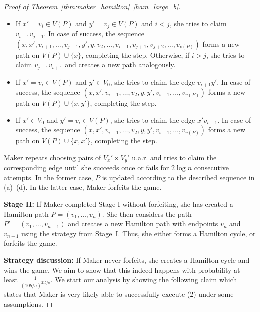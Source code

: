 \documentclass[11pt, a4paper]{article}
\numberwithin{equation}{section}
\numberwithin{figure}{section}
\begin{document}
\begin{proof}[Proof of Theorem~\ref{thm:maker_hamilton}~\ref{ham_large_b}]
\begin{enumerate}
\begin{itemize}
    \item[(b)] If $x'=v_i \in V(P)$ and $y'=v_j \in V(P)$ and $i < j$, she tries to claim $v_{i-1}v_{j+1}$. In case of success, the sequence 
    $(x,x',v_{i+1},\ldots,v_{j-1},y',y,v_2,\ldots,v_{i-1},v_{j+1},v_{j+2},\ldots,v_{v(P)})$ forms a new path on $V(P) \cup \{x\}$, completing the step. Otherwise, if $i > j$, she tries to claim $v_{j-1}v_{i+1}$ and creates a new path analogously.
    
    \item[(c)] If $x'=v_i \in V(P)$ and $y' \in V_0$, she tries to claim the edge $v_{i+1}y'$. In case of success, the sequence $(x,x',v_{i-1},\ldots,v_2,y,y',v_{i+1},\ldots,v_{v(P)})$ forms a new path on $V(P) \cup \{x,y'\}$, completing the step.
    
    \item[(d)] If $x' \in V_0$ and $y'=v_i \in V(P)$, she tries to claim the edge $x'v_{i-1}$. In case of success, the sequence $(x,x',v_{i-1},\ldots,v_2,y,y',v_{i+1},\ldots,v_{v(P)})$ forms a new path on $V(P) \cup \{x,x'\}$, completing the step.
\end{itemize}

Maker repeats choosing pairs of $V_x' \times V_y'$ u.a.r. and tries to claim the corresponding edge until she succeeds once or fails for $2\log n$ consecutive attempts. 
In the former case, $P$ is updated according to the described sequence in (a)--(d). 
In the latter case, Maker forfeits the game.
\end{enumerate}
	
\textbf{Stage II:}
If Maker completed Stage I without forfeiting, she has created a Hamilton path $P = (v_1,\ldots,v_n)$. She then considers the path $P' = (v_1,\ldots,v_{n-1})$ and creates a new Hamilton path with endpoints $v_n$ and $v_{n-1}$ using the strategy from Stage~I. Thus, she either forms a Hamilton cycle, or forfeits the game.

\medskip

\textbf{Strategy discussion:}
If Maker never forfeits, she creates a Hamilton cycle
and wins the game. We aim to show that this indeed happens with probability at least
$\frac{1}{(10b/a)^{21b/a}}$.
We start our analysis by showing the following claim which states that Maker is very likely able to successfully execute (2) under some assumptions.


\end{proof}
\end{document}
